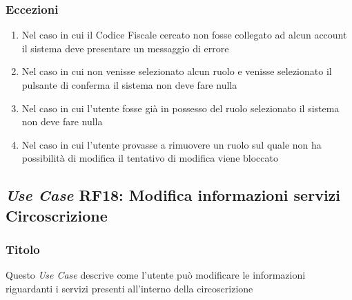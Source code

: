         \subsubsection{Eccezioni}
            \begin{enumerate}
                \item Nel caso in cui il Codice Fiscale cercato non fosse collegato ad alcun account il sistema deve presentare un messaggio di errore
                \item Nel caso in cui non venisse selezionato alcun ruolo e venisse selezionato il pulsante di conferma il sistema non deve fare nulla
                \item Nel caso in cui l'utente fosse già in possesso del ruolo selezionato il sistema non deve fare nulla
                \item Nel caso in cui l'utente provasse a rimuovere un ruolo sul quale non ha possibilità di modifica il tentativo di modifica viene bloccato
            \end{enumerate}

    \subsection{\textit{Use Case} RF18: Modifica informazioni servizi Circoscrizione}
        \subsubsection{Titolo}
        Questo \textit{Use Case} descrive come l'utente può modificare le informazioni riguardanti i servizi presenti all'interno della circoscrizione
